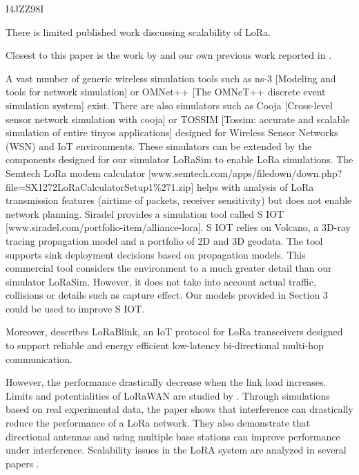 

\cite{bor_lora_2016} I4JZZ98I

There is limited published work discussing scalability of LoRa.

Closest to this paper is the work by \citet{petajajarvi_coverage_2015} and our own previous work reported in \cite{bor_lora_nodate}.

A vast number of generic wireless simulation tools such as ns-3 [Modeling and tools for network simulation] or OMNet++ [The OMNeT++ discrete event simulation system] exist.
There are also simulators such as Cooja [Cross-level sensor network simulation with cooja] or TOSSIM [Tossim:
	accurate and scalable simulation of entire tinyos applications] designed for Wireless Sensor Networks (WSN) and IoT environments.
These simulators can be extended by the components designed for our simulator LoRaSim to enable LoRa simulations.
The Semtech LoRa modem calculator [www.semtech.com/apps/ﬁledown/down.php? ﬁle=SX1272LoRaCalculatorSetup1\%271.zip] helps with analysis of LoRa transmission features (airtime of packets,
receiver sensitivity) but does not enable network planning.
Siradel provides a simulation tool called S IOT [www.siradel.com/portfolio-item/alliance-lora].
S IOT relies on Volcano,
	a 3D-ray tracing propagation model and a portfolio of 2D and 3D geodata.
The tool supports sink deployment decisions based on propagation models.
This commercial tool considers the environment to a much greater detail than our simulator LoRaSim.
However,
	it does not take into account actual traffic,
	collisions or details such as capture effect.
Our models provided in Section 3 could be used to improve S IOT.

Moreover,
	\cite{bor_lora_nodate} describes LoRaBlink,
	an IoT protocol for LoRa transceivers designed to support reliable and energy efficient low-latency bi-directional multi-hop communication.


However,
	the performance drastically decrease when the link load increases.
Limits and potentialities of LoRaWAN are studied by \citet{voigt_mitigating_2016}.
Through simulations based on real experimental data,
	the paper shows that interference can drastically reduce the performance of a LoRa network.
They also demonstrate that directional antennas and using multiple base stations can improve performance under interference.
Scalability issues in the LoRA system are analyzed in several papers \cite{bor_lora_2016}\cite{georgiou_low_2017}\cite{mikhaylov_analysis_2016}.

